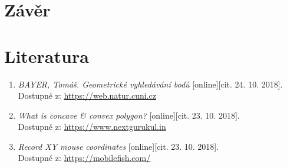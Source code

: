 \documentclass[a4paper, 12pt]{article}
\begin{document}
\section{Závěr}

\clearpage
\section{Literatura}
\begin{enumerate}
\item  \textsl{BAYER, Tomáš. Geometrické vyhledávání bodů} [online][cit. 24. 10. 2018]. \\
Dostupné z: \href{https://web.natur.cuni.cz/~bayertom/images/courses/Adk/adk3.pdf}{https://web.natur.cuni.cz}
\item  \textsl{What is concave \& convex polygon?} [online][cit. 23. 10. 2018]. \\
Dostupné z: \href{https://www.nextgurukul.in/nganswers/ask-question/answer/What-is-concave-38-convex-polygon-/Understanding-Quadrilaterals/75323.htm}{https://www.nextgurukul.in}
\item \textsl{Record XY mouse coordinates} [online][cit. 23. 10. 2018].\\
Dostupné z: \href{https://mobilefish.com/services/record_mouse_coordinates/record_mouse_coordinates.php}{https://mobilefish.com/}\\

\end{enumerate}
\end{document}
